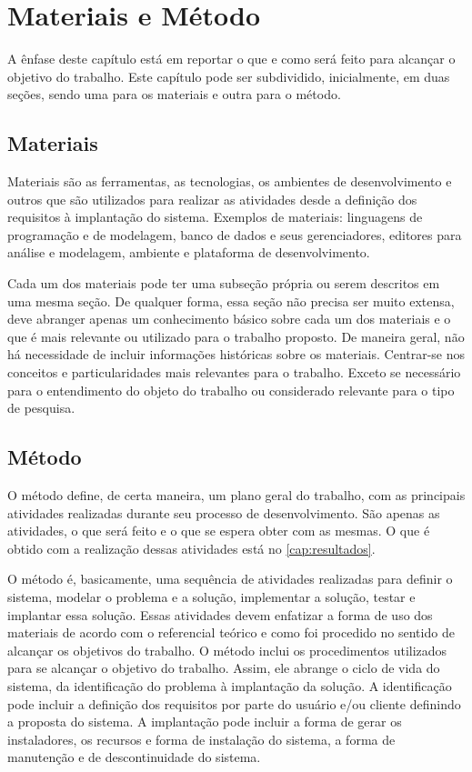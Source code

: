 
\chapter{Materiais e Método}\label{cap:materialemetodos}

A ênfase deste capítulo está em reportar o que e como será feito para alcançar o objetivo do trabalho. Este capítulo pode ser subdividido, inicialmente, em duas seções, sendo uma para os materiais e outra para o método.

\section{Materiais}\label{sec:materiais}

Materiais são as ferramentas, as tecnologias, os ambientes de desenvolvimento e outros que são utilizados para realizar as atividades desde a definição dos requisitos à implantação do sistema. Exemplos de materiais: linguagens de programação e de modelagem, banco de dados e seus gerenciadores, editores para análise e modelagem, ambiente e plataforma de desenvolvimento.

Cada um dos materiais pode ter uma subseção própria ou serem descritos em uma mesma seção. De qualquer forma, essa seção não precisa ser muito extensa, deve abranger apenas um conhecimento básico sobre cada um dos materiais e o que é mais relevante ou utilizado para o trabalho proposto. De maneira geral, não há necessidade de incluir informações históricas sobre os materiais. Centrar-se nos conceitos e particularidades mais relevantes para o trabalho. Exceto se necessário para o entendimento do objeto do trabalho ou considerado relevante para o tipo de pesquisa.

\section{Método}\label{sec:metodo}

O método define, de certa maneira, um plano geral do trabalho, com as principais atividades realizadas durante seu processo de desenvolvimento. São apenas as atividades, o que será feito e o que se espera obter com as mesmas. O que é obtido com a realização dessas atividades está no \autoref{cap:resultados}. 

O método é, basicamente, uma sequência de atividades realizadas para definir o sistema, modelar o problema e a solução, implementar a solução, testar e implantar essa solução. Essas atividades devem enfatizar a forma de uso dos materiais de acordo com o referencial teórico e como foi procedido no sentido de alcançar os objetivos do trabalho.
O método inclui os procedimentos utilizados para se alcançar o objetivo do trabalho. Assim, ele abrange o ciclo de vida do sistema, da identificação do problema à implantação da solução. A identificação pode incluir a definição dos requisitos por parte do usuário e/ou cliente definindo a proposta do sistema. A implantação pode incluir a forma de gerar os instaladores, os recursos e forma de instalação do sistema, a forma de manutenção e de descontinuidade do sistema.

